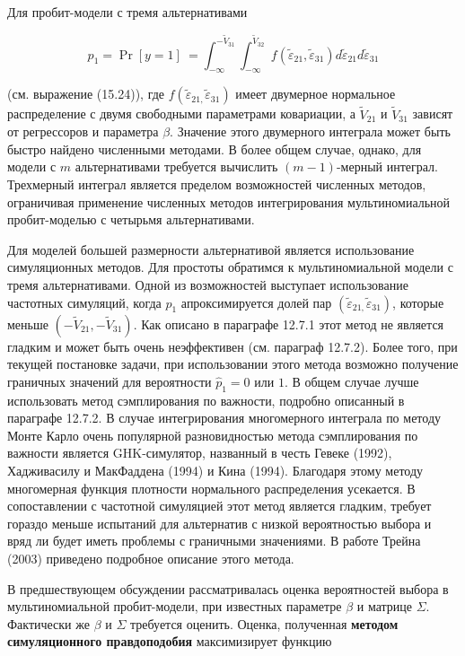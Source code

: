 Для пробит-модели с тремя альтернативами

\[p_1={\Pr  \left[y=1\right]\ }=\int^{-{\tilde{V}}_{31}}_{-\infty }{\int^{{\tilde{V}}_{32}}_{-\infty }{f\left({\widetilde{\varepsilon }}_{21},{\widetilde{\varepsilon }}_{31}\right)d{\widetilde{\varepsilon }}_{21}d{\widetilde{\varepsilon }}_{31}}}\] 

(см. выражение (15.24)), где $f\left({\widetilde{\varepsilon }}_{21,}{\widetilde{\varepsilon }}_{31}\right)$ имеет двумерное нормальное распределение с двумя свободными параметрами ковариации, а ${\tilde{V}}_{21}$ и ${\tilde{V}}_{31}$ зависят от регрессоров и параметра $\beta $. Значение этого двумерного интеграла может быть быстро найдено численными методами. В более общем случае, однако, для модели с $m$ альтернативами требуется вычислить $(m-1)$-мерный интеграл. Трехмерный интеграл является пределом возможностей численных методов, ограничивая применение численных методов интегрирования мультиномиальной пробит-моделью с четырьмя альтернативами.

Для моделей большей размерности альтернативой является использование симуляционных методов. Для простоты обратимся к мультиномиальной модели с тремя альтернативами. Одной из возможностей выступает использование частотных симуляций, когда $p_1$ апроксимируется долей пар $\left({\widetilde{\varepsilon }}_{21,}{\widetilde{\varepsilon }}_{31}\right)$, которые меньше $(-{\tilde{V}}_{21},-{\tilde{V}}_{31})$. Как описано в параграфе 12.7.1 этот метод не является гладким и может быть очень неэффективен (см. параграф 12.7.2). Более того, при текущей постановке задачи, при использовании этого метода возможно получение граничных значений для вероятности ${\hat{p}}_1=0\text{ или } 1$. В общем случае лучше использовать метод сэмплирования по важности, подробно описанный в параграфе 12.7.2. В случае интегрирования многомерного интеграла по методу Монте Карло очень популярной разновидностью метода сэмплирования по важности является GHK-симулятор, названный в честь Гевеке (1992), Хадживасилу и МакФаддена (1994) и Кина (1994). Благодаря этому методу многомерная функция плотности нормального распределения усекается. В сопоставлении с частотной симуляцией этот метод является гладким, требует гораздо меньше испытаний для альтернатив с низкой вероятностью выбора и вряд ли будет иметь проблемы с граничными значениями. В работе Трейна (2003) приведено подробное описание этого метода.

В предшествующем обсуждении рассматривалась оценка вероятностей выбора в мультиномиальной пробит-модели, при известных параметре $\beta $ и матрице $\Sigma $. Фактически же $\beta $ и $\Sigma $ требуется оценить. Оценка, полученная \textbf{методом симуляционного правдоподобия} максимизирует функцию

